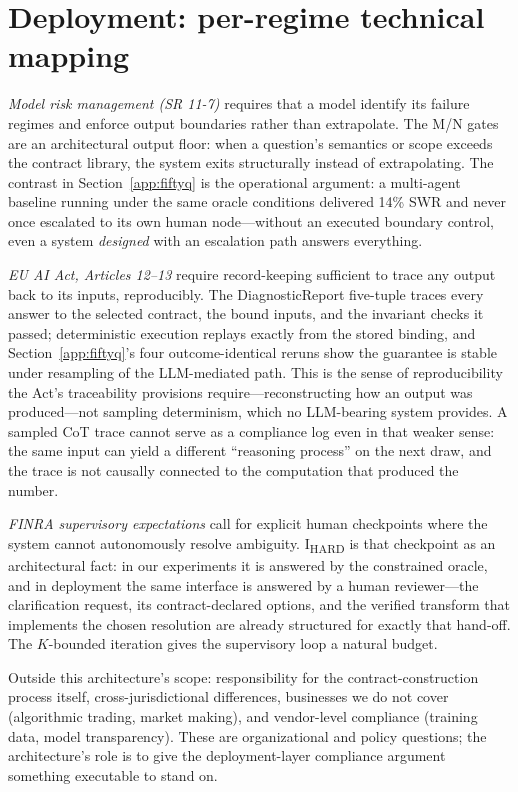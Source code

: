 \section{Deployment: per-regime technical mapping}\label{app:deployment}
\emph{Model risk management (SR 11-7)} \cite{fed2011sr117} requires that a model identify its failure regimes and enforce output boundaries rather than extrapolate.
The M/N gates are an architectural output floor: when a question's semantics or scope exceeds the contract library, the system exits structurally instead of extrapolating.
The contrast in Section~\ref{app:fiftyq} is the operational argument: a multi-agent baseline running under the same oracle conditions delivered 14\% SWR and never once escalated to its own human node---without an executed boundary control, even a system \emph{designed} with an escalation path answers everything.

\emph{EU AI Act, Articles 12--13} \cite{euaiact2024} require record-keeping sufficient to trace any output back to its inputs, reproducibly.
The DiagnosticReport five-tuple traces every answer to the selected contract, the bound inputs, and the invariant checks it passed; deterministic execution replays exactly from the stored binding, and Section~\ref{app:fiftyq}'s four outcome-identical reruns show the guarantee is stable under resampling of the LLM-mediated path.
This is the sense of reproducibility the Act's traceability provisions require---reconstructing how an output was produced---not sampling determinism, which no LLM-bearing system provides.
A sampled CoT trace cannot serve as a compliance log even in that weaker sense: the same input can yield a different ``reasoning process'' on the next draw, and the trace is not causally connected to the computation that produced the number.

\emph{FINRA supervisory expectations} \cite{finra2020ai} call for explicit human checkpoints where the system cannot autonomously resolve ambiguity.
I\textsubscript{HARD} is that checkpoint as an architectural fact: in our experiments it is answered by the constrained oracle, and in deployment the same interface is answered by a human reviewer---the clarification request, its contract-declared options, and the verified transform that implements the chosen resolution are already structured for exactly that hand-off.
The $K$-bounded iteration gives the supervisory loop a natural budget.

Outside this architecture's scope: responsibility for the contract-construction process itself, cross-jurisdictional differences, businesses we do not cover (algorithmic trading, market making), and vendor-level compliance (training data, model transparency).
These are organizational and policy questions; the architecture's role is to give the deployment-layer compliance argument something executable to stand on.

